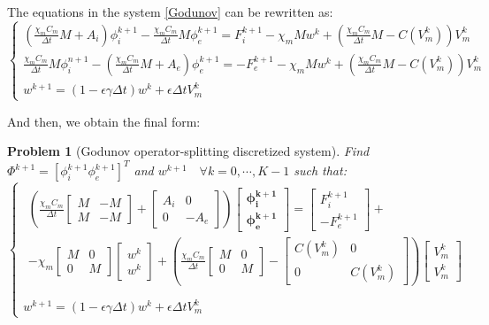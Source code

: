 \documentclass[a4paper,11pt]{article}
\newtheorem{problem}{Problem}
\begin{document}
The equations in the system \ref{Godunov} can be rewritten as:
\begin{equation*}
\begin{cases}
\left( \frac{\chi_m C_m}{\Delta t} M + A_i \right ) \phi_i^{k+1} - \frac{\chi_m C_m}{\Delta t} M \phi_e^{k+1} = F_i^{k+1} - \chi_m M w^k + \left( \frac{\chi_m C_m}{\Delta t} M- C(V_m^k)\right) V_m^k\\
\frac{\chi_m C_m}{\Delta t} M  \phi_i^{n+1} - \left(\frac{\chi_m C_m}{\Delta t} M + A_e \right) \phi_e^{k+1} =  -F_e^{k+1} - \chi_m M w^k + \left( \frac{\chi_m C_m}{\Delta t} M- C(V_m^k)\right) V_m^k \\
w^{k+1} = (1-\epsilon \gamma \Delta t) w^k + \epsilon \Delta tV_m^k
\end{cases}
\end{equation*}

\noindent And then, we obtain the final form:
\begin{problem}[Godunov operator-splitting discretized system] 
	Find $\Phi^{k+1}=[\phi_i^{k+1} \phi_e^{k+1}]^T$ and $w^{k+1} \quad \forall k=0, \cdots, K-1$ such that: 
\begin{equation}
\begin{cases}
\begin{gathered}
\left(
\frac{\chi_m C_m}{\Delta t} \begin{bmatrix}M & -M \\ M & -M\end{bmatrix}
+ \begin{bmatrix} A_i & 0 \\ 0 & -A_e \end{bmatrix}
\right) \begin{bmatrix} \bm{\phi_i^{k+1}} \\ \bm{\phi_e^{k+1}}  \end{bmatrix} =
\begin{bmatrix} F_i^{k+1} \\ -F_e^{k+1} \end{bmatrix} + \\ -
\chi_m\begin{bmatrix} M & 0 \\ 0 & M \end{bmatrix} \begin{bmatrix} w^k \\ w^k \end{bmatrix} +
\left(\frac{\chi_mC_m}{\Delta t}\begin{bmatrix} M & 0 \\ 0 & M \end{bmatrix}
- \begin{bmatrix} C(V_m^k) & 0 \\ 0 & C(V_m^k)\end{bmatrix} 
\right) \begin{bmatrix} V_m^k \\ V_m^k \end {bmatrix}
\end{gathered} \\ \\
w^{k+1} = (1-\epsilon \gamma \Delta t) w^k + \epsilon \Delta tV_m^k
\end{cases}
\end{equation}
\end{problem}
\end{document}
